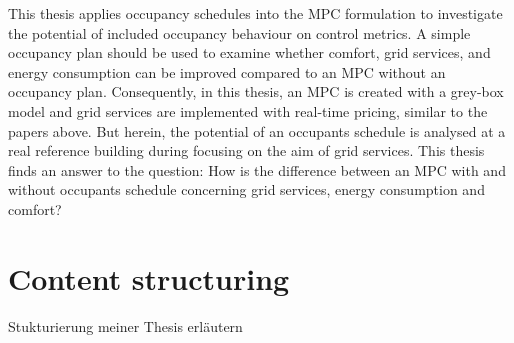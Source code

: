     This thesis applies occupancy schedules into the MPC formulation to investigate the potential of included occupancy behaviour on control metrics. A simple occupancy plan should be used to examine whether comfort, grid services, and energy consumption can be improved compared to an MPC without an occupancy plan. Consequently, in this thesis, an MPC is created with a grey-box model and grid services are implemented with real-time pricing, similar to the papers above. But herein, the potential of an occupants schedule is analysed at a real reference building during focusing on the aim of grid services. This thesis finds an answer to the question: How is the difference between an MPC with and without occupants schedule concerning grid services, energy consumption and comfort? 

 




\section{Content structuring}
\label{section:contentstructuring}
Stukturierung meiner Thesis erläutern
